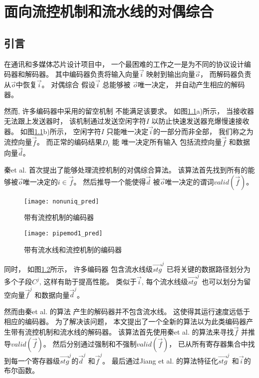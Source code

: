 \chapter{面向流控机制和流水线的对偶综合}
\label{chap:4}

\section{引言}\label{sec_intro}
在通讯和多媒体芯片设计项目中，
一个最困难的工作之一是为不同的协议设计编码器和解码器。
其中编码器负责将输入向量$\vec{i}$ 映射到输出向量$\vec{o}$，
而解码器负责从$\vec{o}$中恢复$\vec{i}$。
对偶综合\cite{ShenICCAD09,ShenTCAD11,ShenTCAD12,LiuICCAD11,LiuTCAD12,TuDAC13}
假设$\vec{i}$ 总能够被 $\vec{o}$唯一决定，
并自动产生相应的解码器。

然而,
许多编码器中采用的留空机制\cite{flowcontrol}
不能满足该要求。
如图\ref{fig_fc}a)所示，
当接收器无法跟上发送器时，
该机制通过发送空闲字符$I$ 以防止快速发送器充爆慢速接收器。
如图\ref{fig_fc}b)所示，
空闲字符$I$
只能唯一决定$\vec{i}$的一部分而非全部，
我们称之为流控向量$\vec{f}$。
而正常的编码结果$D_i$ 能
唯一决定所有输入
包括流控向量$\vec{f}$ 和数据向量$\vec{d}$。

秦et al. \cite{QinTODAES15} 首次提出了能够处理流控机制的对偶综合算法。
该算法首先找到所有的能够被$\vec{o}$唯一决定的$i\in\vec{f}$。
然后推导一个能使得$\vec{d}$ 被$\vec{o}$唯一决定的谓词$valid(\vec{f})$。

\begin{figure}[t]
\centering
\texttt{[image: nonuniq\_pred]}
\caption{带有流控机制的编码器}
\label{fig_fc}
\end{figure}

\begin{figure}[b]
\centering
\texttt{[image: pipemod1\_pred]}
\caption{带有流水线和流控机制的编码器}
\label{pipemod}
\end{figure}



同时，
如图\ref{pipemod}所示，
许多编码器
包含流水线级$\vec{stg}^j$ 已将关键的数据路径划分为多个子段$C^j$,
这样有助于提高性能。
类似于$\vec{i}$,
每个流水线级$\vec{stg}^j$ 也可以划分为留空向量$\vec{f}^j$ 和数据向量$\vec{d}^j$。

然而由秦et al. 的算法\cite{QinTODAES15} 产生的解码器并不包含流水线。
这使得其运行速度远低于相应的编码器。
为了解决该问题，
本文提出了一个全新的算法以为此类编码器产生带有流控机制和流水线的解码器。
该算法首先使用秦et al. \cite{QinTODAES15}的算法来寻找$\vec{f}$ 并推导$valid(\vec{f})$。
然后分别通过强制和不强制$valid(\vec{f})$，
已从所有寄存器集合中找到每一个寄存器级$\vec{stg}^j$的$\vec{d}^j$ 和$\vec{f}^j$。
最后通过Jiang et al. \cite{InterpBoolFunction}的算法特征化$\vec{stg}^j$ 和$\vec{i}$的布尔函数。

